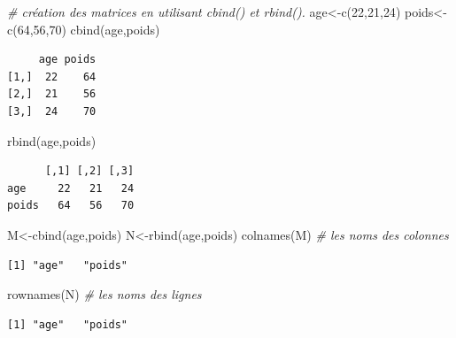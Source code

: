 \documentclass[
  8pt,
  ignorenonframetext,
]{beamer}
\newenvironment{Shaded}{\begin{snugshade}}{\end{snugshade}}
\newcommand{\CommentTok}[1]{\textcolor[rgb]{0.56,0.35,0.01}{\textit{#1}}}
\newcommand{\DecValTok}[1]{\textcolor[rgb]{0.00,0.00,0.81}{#1}}
\newcommand{\FunctionTok}[1]{\textcolor[rgb]{0.00,0.00,0.00}{#1}}
\newcommand{\NormalTok}[1]{#1}
\newcommand{\OtherTok}[1]{\textcolor[rgb]{0.56,0.35,0.01}{#1}}
\begin{document}
\begin{frame}[fragile]{}
\protect\hypertarget{section-2}{}
\begin{Shaded}
\begin{Highlighting}[]
\CommentTok{\# création des matrices en utilisant cbind() et rbind().}
\NormalTok{age}\OtherTok{\textless{}{-}}\FunctionTok{c}\NormalTok{(}\DecValTok{22}\NormalTok{,}\DecValTok{21}\NormalTok{,}\DecValTok{24}\NormalTok{)}
\NormalTok{poids}\OtherTok{\textless{}{-}}\FunctionTok{c}\NormalTok{(}\DecValTok{64}\NormalTok{,}\DecValTok{56}\NormalTok{,}\DecValTok{70}\NormalTok{)}
\FunctionTok{cbind}\NormalTok{(age,poids)}
\end{Highlighting}
\end{Shaded}

\begin{verbatim}
     age poids
[1,]  22    64
[2,]  21    56
[3,]  24    70
\end{verbatim}

\begin{Shaded}
\begin{Highlighting}[]
\FunctionTok{rbind}\NormalTok{(age,poids)}
\end{Highlighting}
\end{Shaded}

\begin{verbatim}
      [,1] [,2] [,3]
age     22   21   24
poids   64   56   70
\end{verbatim}

\begin{Shaded}
\begin{Highlighting}[]
\NormalTok{M}\OtherTok{\textless{}{-}}\FunctionTok{cbind}\NormalTok{(age,poids)}
\NormalTok{N}\OtherTok{\textless{}{-}}\FunctionTok{rbind}\NormalTok{(age,poids)}
\FunctionTok{colnames}\NormalTok{(M)  }\CommentTok{\# les noms des colonnes}
\end{Highlighting}
\end{Shaded}

\begin{verbatim}
[1] "age"   "poids"
\end{verbatim}

\begin{Shaded}
\begin{Highlighting}[]
\FunctionTok{rownames}\NormalTok{(N)  }\CommentTok{\# les noms des lignes}
\end{Highlighting}
\end{Shaded}

\begin{verbatim}
[1] "age"   "poids"
\end{verbatim}
\end{frame}
\end{document}
